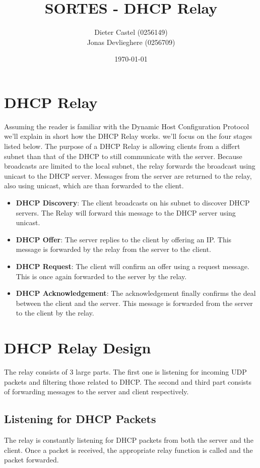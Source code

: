 \documentclass[11pt]{article}
\title{SORTES - DHCP Relay}
\author{Dieter Castel (0256149) \\ Jonas Devlieghere (0256709)}
\date{\today}
\begin{document}
\maketitle
\newpage

\tableofcontents
\newpage

\section{DHCP Relay}
Assuming the reader is familiar with the Dynamic Host Configuration Protocol
we'll explain in short how the DHCP Relay works. we'll focus on the four stages
listed below. The purpose of a DHCP Relay is allowing clients from a differt
subnet than that of the DHCP to still communicate with the server. Because
broadcasts are limited to the local subnet, the relay forwards the broadcast
using unicast to the DHCP server. Messages from the server are returned to the
relay, also using unicast, which are than forwarded to the client.

\begin{itemize}
	\item \textbf{DHCP Discovery}: The client broadcasts on his subnet to
	discover DHCP servers. The Relay will forward this message to the DHCP
	server using unicast.
	\item \textbf{DHCP Offer}: The server replies to the client by offering an
	IP. This message is forwarded by the relay from the server to the client.
	\item \textbf{DHCP Request}: The client will confirm an offer using a request message. This is once again forwarded to the server by the relay.
	\item \textbf{DHCP Acknowledgement}: The acknowledgement finally confirms
	the deal between the client and the server. This message is forwarded from
	the server to the client by the relay.
\end{itemize}

\section{DHCP Relay Design}
The relay consists of 3 large parts. The first one is listening for incoming UDP
packets and filtering those related to DHCP. The second and third part consists
of forwarding messages to the server and client respectively.

\subsection{Listening for DHCP Packets}
The relay is constantly listening for DHCP packets from both the server and the
client. Once a packet is received, the appropriate relay function is called and
the packet forwarded.
\end{document}
